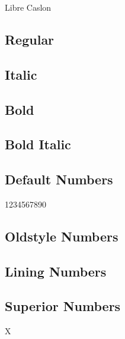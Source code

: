 \documentclass{article}
\begin{document}
\begin{center}\huge
Libre Caslon
\end{center}

\subsection*{Regular}
\lipsum[1]

\subsection*{Italic}
\textit{\lipsum[2]} 

\subsection*{Bold}
\textbf{\lipsum[3]}

\subsection*{Bold Italic}

\textbf{\textit{\lipsum[4]}}

\subsection*{Default Numbers}

1234567890

\subsection*{Oldstyle Numbers}

{}

\subsection*{Lining Numbers}

{}

\subsection*{Superior Numbers}

X
\end{document}
